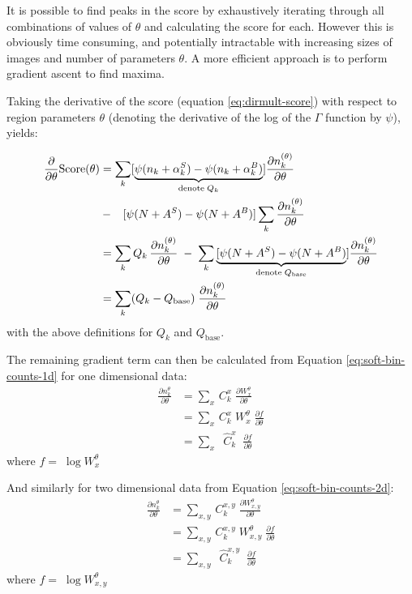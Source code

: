 It is possible to find peaks in the score by exhaustively iterating through all combinations of values of $\theta$ and calculating the score for each. However this is obviously time consuming, and potentially intractable with increasing sizes of images and number of parameters $\theta$. A more efficient approach is to perform gradient ascent to find maxima.

Taking the derivative of the score (equation
\ref{eq:dirmult-score}) with respect to region parameters $\theta$ (denoting the derivative of the log of the $\Gamma$ function by $\psi$), yields:

\begin{align}
\frac{\partial}{\partial\theta}\text{Score}(\theta) 
&= \sum_k [\underbrace{\psi(n_k + \alpha^S_k) - \psi(n_k + \alpha^B_k)}_{\text{denote} \; Q_k}] \frac{\partial n_k^{(\theta)}}{\partial\theta} \notag\\
& - \;\;\; [\psi(N+A^S) - \psi(N+A^B)]\sum_k \frac{\partial n_k^{(\theta)}}{\partial\theta}\\
&= \sum_k  Q_k \, \frac{\partial n_k^{(\theta)}}{\partial\theta}\;-\;
\sum_k
\underbrace{ [\psi(N+A^S) - \psi(N+A^B)}_{\text{denote} \; Q_\text{base}}] \frac{\partial n_k^{(\theta)}}{\partial\theta}\\
&= \sum_k (Q_k - Q_\text{base}) \; \frac{\partial n_k^{(\theta)}}{\partial\theta} \label{eq:score-grad-1d}
\end{align}
with the above definitions for $Q_k$ and $Q_\text{base}$.

The remaining gradient term can then be calculated from Equation \ref{eq:soft-bin-counts-1d} for one dimensional data:
\begin{align}
\frac{\partial n_k^{\theta}}{\partial\theta} &= \sum_{x} \, C^{x}_k \; \frac{\partial W^{\theta}_{x}}{\partial\theta} \\
&= \sum_{x} \, C^{x}_k \;  W^{\theta}_{x} \; \frac{\partial f}{\partial\theta} \\
&= \sum_{x} \;\; \hat{C}^{x}_k \;\; \frac{\partial f}{\partial\theta}\label{weight-grad-1d}
\end{align}
where $f = \; \log W^{\theta}_x$

And similarly for two dimensional data from Equation \ref{eq:soft-bin-counts-2d}:
\begin{align}
\frac{\partial n_k^{\theta}}{\partial\theta} &= \sum_{x,y} \, C^{x,y}_k \; \frac{\partial W^{\theta}_{x,y}}{\partial\theta} \\
&= \sum_{x,y} \, C^{x,y}_k \;  W^{\theta}_{x,y} \; \frac{\partial f}{\partial\theta} \\
&= \sum_{x,y} \;\; \hat{C}^{x,y}_k \;\; \frac{\partial f}{\partial\theta}
\label{weight-grad-2d}
\end{align}
where $f = \; \log W^{\theta}_{x,y}$

